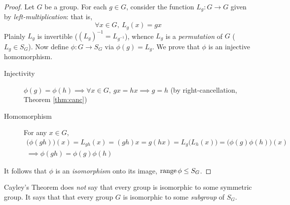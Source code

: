 \begin{proof}
	Let $G$ be a group. For each $g\in G$, consider the function $L_g:G\to G$ given by \emph{left-multiplication}: that is,
	\[
		\forall x\in G,\ L_g(x)=gx
	\]
	Plainly $L_g$ is invertible ($(L_g)^{-1}=L_{g^{-1}}$), whence $L_g$ is a \emph{permutation} of $G$ ($L_g\in S_G$). Now define $\phi:G\to S_G$ via $\phi(g)=L_g$. We prove that $\phi$ is an injective homomorphism.
	\begin{description}
		\item[Injectivity] $\phi(g)=\phi(h)\implies \forall x\in G,\ gx=hx\implies g=h$ \quad (by right-cancellation, Theorem \ref{thm:canc})
		\item[Homomorphism] For any $x\in G$,
		\begin{gather*}
			\bigl(\phi(gh)\bigr)(x) =L_{gh}(x)=(gh)x=g(hx) =L_g\bigl(L_h(x)\bigr)=\bigl(\phi(g)\phi(h)\bigr)(x)\\
			\implies \phi(gh)=\phi(g)\phi(h)
		\end{gather*}
	\end{description}
	It follows that $\phi$ is an \emph{isomorphism} onto its image, $\operatorname{range}\phi\le S_G$.
\end{proof}

Cayley's Theorem does \emph{not} say that every group is isomorphic to some symmetric group. It says that that every group $G$ is isomorphic to some \emph{subgroup} of $S_G$.


